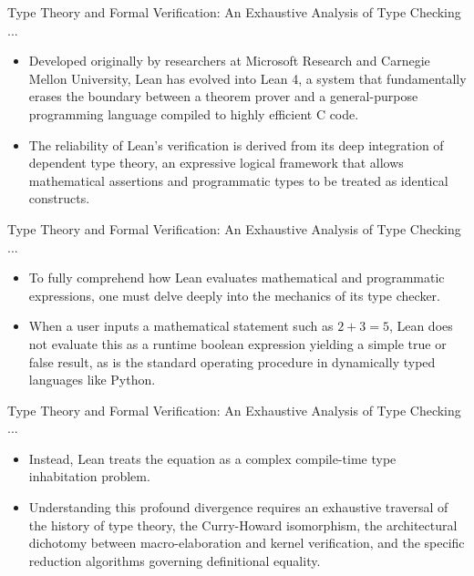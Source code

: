 \documentclass[10pt]{beamer}
\begin{document}
\begin{frame}{Type Theory and Formal Verification: An Exhaustive Analysis of Type Checking ...}
\begin{itemize}\setlength{\itemsep}{1.5em}
  \item Developed originally by researchers at Microsoft Research and Carnegie Mellon University, Lean has evolved into Lean 4, a system that fundamentally erases the boundary between a theorem prover and a general-purpose programming language compiled to highly efficient C code.
  \item The reliability of Lean's verification is derived from its deep integration of dependent type theory, an expressive logical framework that allows mathematical assertions and programmatic types to be treated as identical constructs.
\end{itemize}
\end{frame}

\begin{frame}{Type Theory and Formal Verification: An Exhaustive Analysis of Type Checking ...}
\begin{itemize}\setlength{\itemsep}{1.5em}
  \item To fully comprehend how Lean evaluates mathematical and programmatic expressions, one must delve deeply into the mechanics of its type checker.
  \item When a user inputs a mathematical statement such as $2 + 3 = 5$, Lean does not evaluate this as a runtime boolean expression yielding a simple true or false result, as is the standard operating procedure in dynamically typed languages like Python.
\end{itemize}
\end{frame}

\begin{frame}{Type Theory and Formal Verification: An Exhaustive Analysis of Type Checking ...}
\begin{itemize}\setlength{\itemsep}{1.5em}
  \item Instead, Lean treats the equation as a complex compile-time type inhabitation problem.
  \item Understanding this profound divergence requires an exhaustive traversal of the history of type theory, the Curry-Howard isomorphism, the architectural dichotomy between macro-elaboration and kernel verification, and the specific reduction algorithms governing definitional equality.
\end{itemize}
\end{frame}
\end{document}
